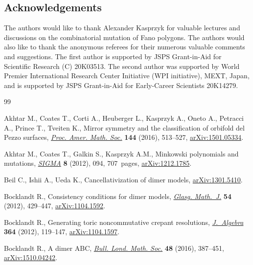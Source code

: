 \documentclass[pdftex]{sigma}%
\numberwithin{equation}{section}
\numberwithin{figure}{section}
\numberwithin{table}{section}
\begin{document}
\subsection*{Acknowledgements}
The authors would like to thank Alexander Kasprzyk for valuable lectures and discussions on the combinatorial mutation of Fano polygons.
The authors would also like to thank the anonymous referees for their numerous valuable comments and suggestions.
The first author is supported by JSPS Grant-in-Aid for Scientific Research (C) 20K03513.
The second author was supported by World Premier International Research Center Initiative (WPI initiative), MEXT, Japan, and is supported by JSPS Grant-in-Aid for Early-Career Scientists 20K14279.

\begin{thebibliography}{99}
\footnotesize\itemsep=0pt

Akhtar M., Coates T., Corti A., Heuberger L., Kasprzyk A., Oneto A., Petracci
 A., Prince T., Tveiten K., Mirror symmetry and the classification of orbifold
 del {P}ezzo surfaces, \href{https://doi.org/10.1090/proc/12876}{\textit{Proc. Amer. Math. Soc.}} \textbf{144} (2016),
 513--527, \href{https://arxiv.org/abs/1501.05334}{arXiv:1501.05334}.

Akhtar M., Coates T., Galkin S., Kasprzyk A.M., Minkowski polynomials and
 mutations, \href{https://doi.org/10.3842/SIGMA.2012.094}{\textit{SIGMA}} \textbf{8} (2012), 094, 707~pages,
 \href{https://arxiv.org/abs/1212.1785}{arXiv:1212.1785}.

Beil C., Ishii A., Ueda K., Cancellativization of dimer models,
 \href{https://arxiv.org/abs/1301.5410}{arXiv:1301.5410}.

Bocklandt R., Consistency conditions for dimer models, \href{https://doi.org/10.1017/S0017089512000080}{\textit{Glasg. Math.~J.}}
 \textbf{54} (2012), 429--447, \href{https://arxiv.org/abs/1104.1592}{arXiv:1104.1592}.

Bocklandt R., Generating toric noncommutative crepant resolutions,
 \href{https://doi.org/10.1016/j.jalgebra.2012.03.040}{\textit{J.~Algebra}} \textbf{364} (2012), 119--147, \href{https://arxiv.org/abs/1104.1597}{arXiv:1104.1597}.

Bocklandt R., A dimer {ABC}, \href{https://doi.org/10.1112/blms/bdv101}{\textit{Bull. Lond. Math. Soc.}} \textbf{48}
 (2016), 387--451, \href{https://arxiv.org/abs/1510.04242}{arXiv:1510.04242}.


\end{thebibliography}
\end{document}
